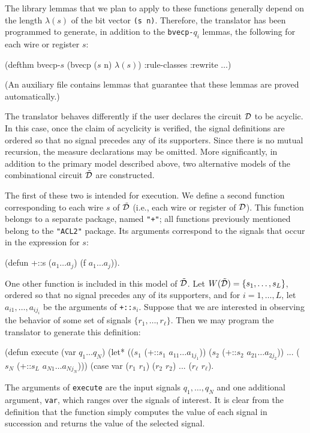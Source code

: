 \documentclass{article}
\begin{document}
The library lemmas that we plan to apply to these functions generally
depend on the length $\lambda(s)$ of the bit vector {\tt (s n)}.
Therefore, the translator has been programmed to generate, in addition
to the {\tt bvecp-}$q_i$ lemmas, the following for each wire or
register $s$:\medskip

\begin{acl2}
(defthm bvecp-$s$
  (bvecp ($s$ n) $\lambda(s)$)
  :rule-classes :rewrite $\ldots$)
\end{acl2}\noindent
(An auxiliary file contains lemmas that guarantee that these 
lemmas are proved automatically.)

The translator behaves differently if the user declares the circuit
${\cal D}$ to be acyclic.  In this case, once the claim of acyclicity
is verified, the signal definitions are ordered so that no signal
precedes any of its supporters.  Since there is no mutual recursion,
the measure declarations may be omitted.  More significantly, in
addition to the primary model described above, two alternative models
of the combinational circuit $\tilde{\cal D}$ are constructed.

The first of these two is intended for execution.  We define a second
function corresponding to each wire $s$ of $\tilde{\cal D}$ (i.e.,
each wire or register of ${\cal D}$).  This function belongs to a
separate package, named \verb!"+"!; all functions previously mentioned
belong to the \verb!"ACL2"! package.  Its arguments correspond to the
signals that occur in the expression for $s$:\medskip

\begin{acl2}
(defun +::s ($a_1 \ldots a_j$)
  (f $a_1 \ldots a_j$)).
\end{acl2}
\indent One other function is included in this model of $\tilde{\cal D}$.  Let
$W(\tilde{\cal D}) = \{s_1,\ldots,s_L\}$, ordered so that no signal precedes
any of its supporters, and for $i = 1,\ldots,L$, let $a_{i1},\ldots,a_{ij_i}$
be the arguments of \verb!+::!$s_i$.  Suppose that we are interested in
observing the behavior of some set of signals $\{r_1,\ldots,r_\ell\}$.  Then we
may program the translator to generate this definition:\medskip

\begin{acl2}
(defun execute (var $q_1 \ldots q_N$)
  (let* (($s_1$ (+::$s_1$ $a_{11} \ldots a_{1j_1}$))
         ($s_2$ (+::$s_2$ $a_{21} \ldots a_{2j_2}$))
          ...
         ($s_N$ (+::$s_L$ $a_{N1} \ldots a_{Nj_N}$)))
    (case var
      ($r_1$ $r_1$)
      ($r_2$ $r_2$)
      ...
      ($r_\ell$ $r_\ell$).
\end{acl2}\noindent
The arguments of {\tt execute} are the input signals $q_1,\ldots,q_N$
and one additional argument, {\tt var}, which ranges over the signals
of interest.  It is clear from the definition that the function simply
computes the value of each signal in succession and returns the value
of the selected signal.
\end{document}
